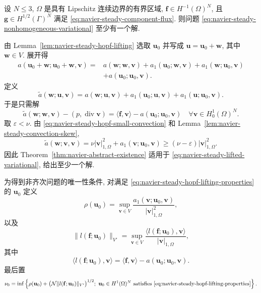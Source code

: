 \setcounter{statement}{2}
\begin{Theorem}\label{thm:navier-steady-nonhomogeneous-existence}
设 $N\leq3$, $\Omega$ 是具有 Lipschitz 连续边界的有界区域,
$\mathbf f\in H^{-1}(\Omega)^N$, 且
$\mathbf g\in H^{1/2}(\Gamma)^N$ 满足
\eqref{eq:navier-steady-component-flux}. 则问题
\eqref{eq:navier-steady-nonhomogeneous-variational} 至少有一个解.
\end{Theorem}
\begin{Proof}
由 Lemma~\ref{lem:navier-steady-hopf-lifting} 选取
$\mathbf u_0$ 并写成 $\mathbf u=\mathbf u_0+\mathbf w$, 其中
$\mathbf w\in V$. 展开得
\[
\begin{aligned}
a(\mathbf u_0+\mathbf w;\mathbf u_0+\mathbf w,\mathbf v)
={}&a(\mathbf w;\mathbf w,\mathbf v)
+a_1(\mathbf u_0;\mathbf w,\mathbf v)
+a_1(\mathbf w;\mathbf u_0,\mathbf v)\\
&+a(\mathbf u_0;\mathbf u_0,\mathbf v).
\end{aligned}
\]
定义
\[
\widetilde a(\mathbf w;\mathbf u,\mathbf v)
=a(\mathbf w;\mathbf u,\mathbf v)
+a_1(\mathbf u_0;\mathbf u,\mathbf v)
+a_1(\mathbf u;\mathbf u_0,\mathbf v).
\]
于是只需解
\begin{equation}\label{eq:navier-steady-lifted-variational}
\widetilde a(\mathbf w;\mathbf w,\mathbf v)
-(p,\operatorname{div}\mathbf v)
=\langle\mathbf f,\mathbf v\rangle
-a(\mathbf u_0;\mathbf u_0,\mathbf v)
\quad\forall\mathbf v\in H_0^1(\Omega)^N.
\end{equation}
取 $\varepsilon<\nu$. 由
\eqref{eq:navier-steady-hopf-small-convection} 和
Lemma~\ref{lem:navier-steady-convection-skew},
\[
\widetilde a(\mathbf w;\mathbf v,\mathbf v)
=\nu|\mathbf v|_{1,\Omega}^2
+a_1(\mathbf v;\mathbf u_0,\mathbf v)
\geq(\nu-\varepsilon)|\mathbf v|_{1,\Omega}^2.
\]
因此 Theorem~\ref{thm:navier-abstract-existence} 适用于
\eqref{eq:navier-steady-lifted-variational}, 给出至少一个解.
\end{Proof}

为得到非齐次问题的唯一性条件, 对满足
\eqref{eq:navier-steady-hopf-lifting-properties} 的 $\mathbf u_0$ 定义
\begin{equation}\label{eq:navier-steady-lifting-rho}
\rho(\mathbf u_0)
=\sup_{\mathbf v\in V}
\frac{a_1(\mathbf v;\mathbf u_0,\mathbf v)}{|\mathbf v|_{1,\Omega}^2},
\end{equation}
以及
\begin{equation}\label{eq:navier-steady-lifted-load-norm}
\|l(\mathbf f;\mathbf u_0)\|_{V'}
=\sup_{\mathbf v\in V}
\frac{\langle l(\mathbf f;\mathbf u_0),\mathbf v\rangle}
{|\mathbf v|_{1,\Omega}},
\end{equation}
其中
\[
\langle l(\mathbf f;\mathbf u_0),\mathbf v\rangle
=\langle\mathbf f,\mathbf v\rangle
-a(\mathbf u_0;\mathbf u_0,\mathbf v).
\]
最后置
\begin{equation}\label{eq:navier-steady-critical-viscosity}
\nu_0=
\inf\left\{
\rho(\mathbf u_0)
+\bigl(\mathcal N\|l(\mathbf f;\mathbf u_0)\|_{V'}\bigr)^{1/2};
\ \mathbf u_0\in H^1(\Omega)^N
\text{ satisfies \eqref{eq:navier-steady-hopf-lifting-properties}}
\right\}.
\end{equation}

